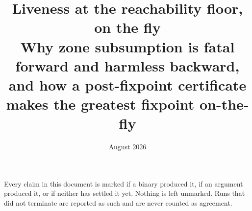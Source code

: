 \documentclass[11pt]{article}
\title{Liveness at the reachability floor, on the fly\\[4pt]
\large Why zone subsumption is fatal forward and harmless backward,\\
and how a post-fixpoint certificate makes the greatest fixpoint on-the-fly}
\author{\tool{}}
\date{August 2026}
\begin{document}
\maketitle

\noindent
Every claim in this document is marked \measured{} if a binary produced it, \proved{} if an
argument produced it, or \openq{} if neither has settled it yet. Nothing is left unmarked. Runs
that did not terminate are reported as such and are never counted as agreement.

\tableofcontents











\end{document}
